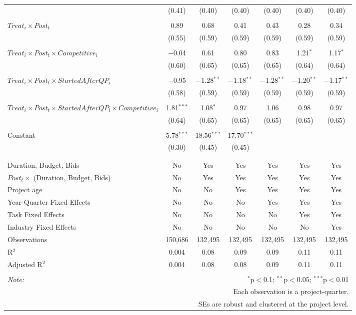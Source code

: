 \documentclass[
]{article}
\begin{document}
\begin{table}[H]
\begin{tabular}{@{\extracolsep{-3pt}}lcccccc}
  & (0.41) & (0.40) & (0.40) & (0.40) & (0.40) & (0.40) \\ 
  & & & & & & \\ 
 $Treat_i \times Post_t$ & 0.89 & 0.68 & 0.41 & 0.43 & 0.28 & 0.34 \\ 
  & (0.55) & (0.59) & (0.59) & (0.59) & (0.59) & (0.59) \\ 
  & & & & & & \\ 
 $Treat_i \times Post_t \times Competitive_i$ & $-$0.04 & 0.61 & 0.80 & 0.83 & 1.21$^{*}$ & 1.17$^{*}$ \\ 
  & (0.60) & (0.65) & (0.65) & (0.65) & (0.64) & (0.64) \\ 
  & & & & & & \\ 
 $Treat_i \times Post_t \times StartedAfterQP_i$ & $-$0.95 & $-$1.28$^{**}$ & $-$1.18$^{**}$ & $-$1.28$^{**}$ & $-$1.20$^{**}$ & $-$1.17$^{**}$ \\ 
  & (0.58) & (0.59) & (0.59) & (0.59) & (0.59) & (0.59) \\ 
  & & & & & & \\ 
 $Treat_i \times Post_t \times StartedAfterQP_i \times Competitive_i$ & 1.81$^{***}$ & 1.08$^{*}$ & 0.97 & 1.06 & 0.98 & 0.97 \\ 
  & (0.64) & (0.65) & (0.65) & (0.65) & (0.65) & (0.65) \\ 
  & & & & & & \\ 
 Constant & 5.78$^{***}$ & 18.56$^{***}$ & 17.70$^{***}$ &  &  &  \\ 
  & (0.30) & (0.45) & (0.45) &  &  &  \\ 
  & & & & & & \\ 
\hline \\[-1.8ex] 
Duration, Budget, Bids & No & Yes & Yes & Yes & Yes & Yes \\ 
$Post_t \times $  (Duration, Budget, Bids) & No & Yes & Yes & Yes & Yes & Yes \\ 
Project age & No & No & Yes & Yes & Yes & Yes \\ 
Year-Quarter Fixed Effects & No & No & No & Yes & Yes & Yes \\ 
Task Fixed Effects & No & No & No & No & Yes & Yes \\ 
Industry Fixed Effects & No & No & No & No & No & Yes \\ 
Observations & 150,686 & 132,495 & 132,495 & 132,495 & 132,495 & 132,495 \\ 
R$^{2}$ & 0.004 & 0.08 & 0.09 & 0.09 & 0.11 & 0.11 \\ 
Adjusted R$^{2}$ & 0.004 & 0.08 & 0.08 & 0.09 & 0.11 & 0.11 \\ 
\hline 
\hline \\[-1.8ex] 
\textit{Note:}  & \multicolumn{6}{r}{$^{*}$p$<$0.1; $^{**}$p$<$0.05; $^{***}$p$<$0.01} \\ 
 & \multicolumn{6}{r}{Each observation is a project-quarter.} \\ 
 & \multicolumn{6}{r}{SEs are robust and clustered at the project level.} \\ 
\end{tabular} 
\end{table}
\end{document}
